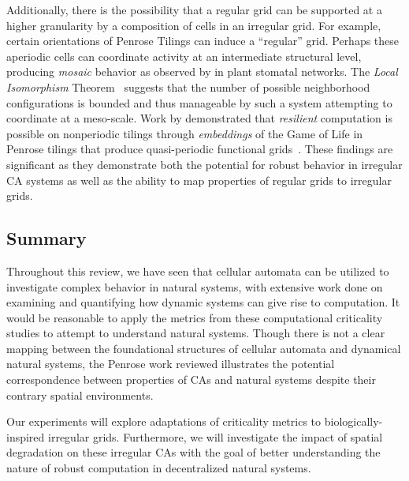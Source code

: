 \documentclass[a4paper,11pt]{article}
\begin{document}
Additionally, there is the possibility that a regular grid can be supported at a higher granularity by a composition of cells in an irregular grid.
For example, certain orientations of Penrose Tilings can induce a ``regular'' grid.
Perhaps these aperiodic cells can coordinate activity at an intermediate structural level, producing \textit{mosaic} behavior as observed by \citeauthor{me07} in plant stomatal networks.
The \textit{Local Isomorphism} Theorem~\cite{ef06}
suggests that the number of possible neighborhood configurations is bounded and thus manageable by such a system attempting to coordinate at a meso-scale.
Work by \citeauthor{ba13} demonstrated that \textit{resilient} computation is possible on nonperiodic tilings through \textit{embeddings} of the Game of Life in Penrose tilings that produce quasi-periodic functional grids~\cite{ba13}.
These findings are significant as they demonstrate both the potential for robust behavior in irregular CA systems as well as the ability to map properties of regular grids to irregular grids.

\subsection{Summary}
\label{sec:PrevSum}

Throughout this review, we have seen that cellular automata can be utilized to investigate complex behavior in natural systems, with extensive work done on examining and quantifying how dynamic systems can give rise to computation. It would be reasonable to apply the metrics from these computational criticality studies to attempt to understand natural systems. Though there is not a clear mapping between the foundational structures of cellular automata and dynamical natural systems, the Penrose work reviewed illustrates the potential correspondence between properties of CAs and natural systems despite their contrary spatial environments.

Our experiments will explore adaptations of criticality metrics to biologically-inspired irregular grids.
Furthermore, we will investigate the impact of spatial degradation on these irregular CAs with the goal of better understanding the nature of robust computation in decentralized natural systems.

\end{document}
